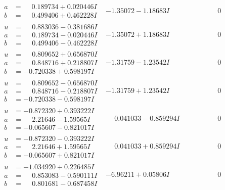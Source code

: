 \documentclass[1p]{elsarticle_modified}
\theoremstyle{definition}
\begin{document}
$$\begin{array}{c|c|c}
\begin{aligned}
a &= \phantom{-}0.189734 + 0.020446 I \\
b &= \phantom{-}0.499406 + 0.462228 I\end{aligned}
 & -1.35072 - 1.18683 I & \phantom{-0.000000 } 0 \\ \hline\begin{aligned}
u &= \phantom{-}0.883036 - 0.381686 I \\
a &= \phantom{-}0.189734 - 0.020446 I \\
b &= \phantom{-}0.499406 - 0.462228 I\end{aligned}
 & -1.35072 + 1.18683 I & \phantom{-0.000000 } 0 \\ \hline\begin{aligned}
u &= \phantom{-}0.809652 + 0.656870 I \\
a &= \phantom{-}0.848716 + 0.218807 I \\
b &= -0.720338 + 0.598197 I\end{aligned}
 & -1.31759 - 1.23542 I & \phantom{-0.000000 } 0 \\ \hline\begin{aligned}
u &= \phantom{-}0.809652 - 0.656870 I \\
a &= \phantom{-}0.848716 - 0.218807 I \\
b &= -0.720338 - 0.598197 I\end{aligned}
 & -1.31759 + 1.23542 I & \phantom{-0.000000 } 0 \\ \hline\begin{aligned}
u &= -0.872320 + 0.393222 I \\
a &= \phantom{-}2.21646 - 1.59565 I \\
b &= -0.065607 - 0.821017 I\end{aligned}
 & \phantom{-}0.041033 - 0.859294 I & \phantom{-0.000000 } 0 \\ \hline\begin{aligned}
u &= -0.872320 - 0.393222 I \\
a &= \phantom{-}2.21646 + 1.59565 I \\
b &= -0.065607 + 0.821017 I\end{aligned}
 & \phantom{-}0.041033 + 0.859294 I & \phantom{-0.000000 } 0 \\ \hline\begin{aligned}
u &= -1.034920 + 0.226485 I \\
a &= \phantom{-}0.853083 - 0.590111 I \\
b &= \phantom{-}0.801681 - 0.687458 I\end{aligned}
 & -6.96211 + 0.05806 I & \phantom{-0.000000 } 0 \\ \hline\begin{aligned}

\end{aligned}
\end{array}$$
\end{document}
